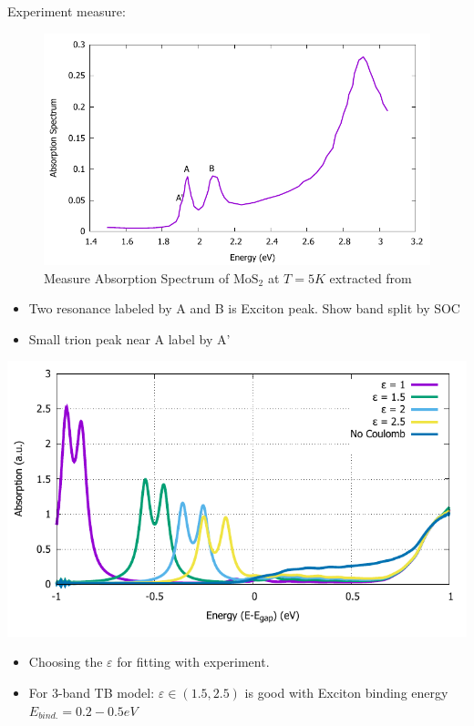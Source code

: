 \documentclass{beamer}
\begin{document}
	\begin{frame}
		Experiment measure:
		\begin{multicols}{2}
		\begin{figure}
	\includegraphics[width = 1\linewidth]{images/Experiment.pdf}
	\caption{Measure Absorption Spectrum of $\mathrm{MoS}_2$ at $T=5K$  extracted from \cite{zhang_absorption_2014}}
	\end{figure}
	\columnbreak
	\begin{itemize}
		\item Two resonance labeled by A and B is Exciton peak. Show band split by SOC
		\item Small trion peak near A label by A'
	\end{itemize}
	\end{multicols}
	\end{frame}
\begin{frame}
	\includegraphics[width=0.8\linewidth]{images/varyepsilon.pdf}
	\begin{itemize}
		\item Choosing the $\varepsilon$ for fitting with experiment.
		\item For 3-band TB model: $\varepsilon \in (1.5,2.5)$ is good with Exciton binding energy $E_{bind.}= 0.2-0.5 eV$ 
	\end{itemize}
\end{frame}
\end{document}
